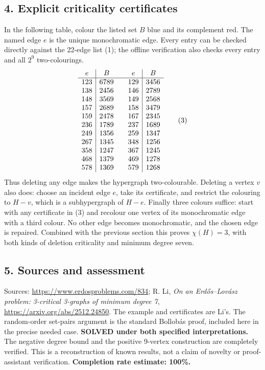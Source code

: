 \subsection*{4. Explicit criticality certificates}
In the following table, colour the listed set $B$ blue and its complement red. The named edge $e$ is the unique monochromatic edge. Every entry can be checked directly against the 22-edge list (1); the offline verification also checks every entry and all $2^9$ two-colourings.
\[
\begin{array}{c|c@{\qquad}c|c}
e&B&e&B\\\hline
123&6789&129&3456\\
138&2456&146&2789\\
148&3569&149&2568\\
157&2689&158&3479\\
159&2478&167&2345\\
236&1789&237&1689\\
249&1356&259&1347\\
267&1345&348&1256\\
358&1247&367&1245\\
468&1379&469&1278\\
578&1369&579&1268
\end{array}                                               \tag{3}
\]
Thus deleting any edge makes the hypergraph two-colourable. Deleting a vertex $v$ also does: choose an incident edge $e$, take its certificate, and restrict the colouring to $H-v$, which is a subhypergraph of $H-e$. Finally three colours suffice: start with any certificate in (3) and recolour one vertex of its monochromatic edge with a third colour. No other edge becomes monochromatic, and the chosen edge is repaired. Combined with the previous section this proves $\chi(H)=3$, with both kinds of deletion criticality and minimum degree seven.
\subsection*{5. Sources and assessment}
Sources: \url{https://www.erdosproblems.com/834}; R. Li, \emph{On an Erd\H{o}s--Lov\'asz problem: 3-critical 3-graphs of minimum degree 7}, \url{https://arxiv.org/abs/2512.24850}. The example and certificates are Li's. The random-order set-pairs argument is the standard Bollob\'as proof, included here in the precise needed case.
\textbf{SOLVED under both specified interpretations.} The negative degree bound and the positive 9-vertex construction are completely verified. This is a reconstruction of known results, not a claim of novelty or proof-assistant verification.
\textbf{Completion rate estimate: 100\%.}

